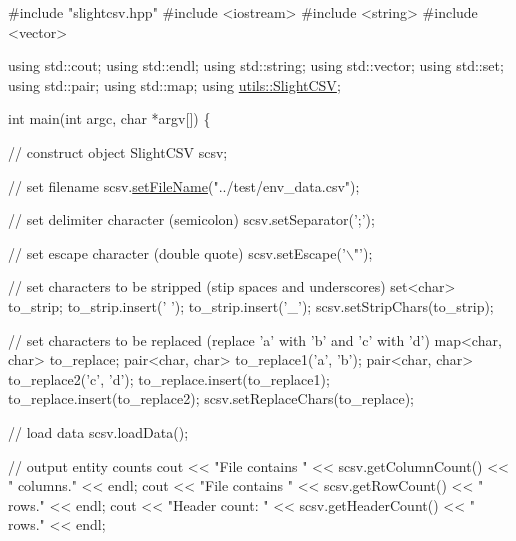 \begin{DoxyCode}
\textcolor{preprocessor}{#include "slightcsv.hpp"}
\textcolor{preprocessor}{#include <iostream>}
\textcolor{preprocessor}{#include <string>}
\textcolor{preprocessor}{#include <vector>}

\textcolor{keyword}{using} std::cout;
\textcolor{keyword}{using} std::endl;
\textcolor{keyword}{using} std::string;
\textcolor{keyword}{using} std::vector;
\textcolor{keyword}{using} std::set;
\textcolor{keyword}{using} std::pair;
\textcolor{keyword}{using} std::map;
\textcolor{keyword}{using} \hyperlink{classutils_1_1SlightCSV}{utils::SlightCSV};

\textcolor{keywordtype}{int} main(\textcolor{keywordtype}{int} argc, \textcolor{keywordtype}{char} *argv[]) \{

    \textcolor{comment}{// construct object}
    SlightCSV scsv;

    \textcolor{comment}{// set filename}
    scsv.\hyperlink{classutils_1_1SlightCSV_a9567504e450440a9564053c8ab6f6ff9}{setFileName}(\textcolor{stringliteral}{"../test/env\_data.csv"});

    \textcolor{comment}{// set delimiter character (semicolon)}
    scsv.setSeparator(\textcolor{charliteral}{';'});

    \textcolor{comment}{// set escape character (double quote)}
    scsv.setEscape(\textcolor{charliteral}{'\(\backslash\)"'});

    \textcolor{comment}{// set characters to be stripped (stip spaces and underscores)}
    set<char> to\_strip;
    to\_strip.insert(\textcolor{charliteral}{' '});
    to\_strip.insert(\textcolor{charliteral}{'\_'});
    scsv.setStripChars(to\_strip);

    \textcolor{comment}{// set characters to be replaced (replace 'a' with 'b' and 'c' with 'd')}
    map<char, char> to\_replace;
    pair<char, char> to\_replace1(\textcolor{charliteral}{'a'}, \textcolor{charliteral}{'b'});
    pair<char, char> to\_replace2(\textcolor{charliteral}{'c'}, \textcolor{charliteral}{'d'});
    to\_replace.insert(to\_replace1);
    to\_replace.insert(to\_replace2);
    scsv.setReplaceChars(to\_replace);

    \textcolor{comment}{// load data}
    scsv.loadData();

    \textcolor{comment}{// output entity counts}
    cout << \textcolor{stringliteral}{"File contains "} << scsv.getColumnCount() << \textcolor{stringliteral}{" columns."} << endl;
    cout << \textcolor{stringliteral}{"File contains "} << scsv.getRowCount() << \textcolor{stringliteral}{" rows."} << endl;
    cout << \textcolor{stringliteral}{"Header count: "} << scsv.getHeaderCount() << \textcolor{stringliteral}{" rows."} << endl;


\end{DoxyCode}
